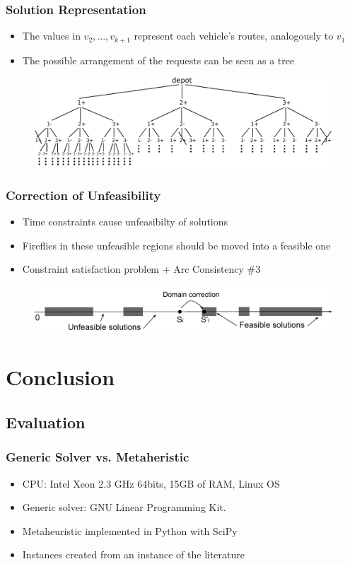\documentclass{beamer}
\begin{document}
\begin{frame}
\frametitle{Solution Representation}
\begin{itemize}
\item The values in $v_2,...,v_{k+1}$ represent each vehicle's routes, analogously to $v_1$
\item The possible arrangement of the requests can be seen as a tree
\end{itemize}
\begin{figure}[b]
\centering
\includegraphics[width=\textwidth]{fig_tree_bus_route}
\end{figure}
\end{frame}

\begin{frame}
\frametitle{Correction of Unfeasibility}
\begin{itemize}
\item Time constraints cause unfeasibilty of solutions
\item Fireflies in these unfeasible regions should be moved into a feasible one
\item Constraint satisfaction problem + Arc Consistency \#3
\end{itemize}
\begin{figure}[b]
\centering
\includegraphics[width=\textwidth]{fig_solution_domain}
\end{figure}
\end{frame}

\section{Conclusion}
\subsection{Evaluation}
\begin{frame}
\frametitle{Generic Solver vs. Metaheristic}
\begin{itemize}
\item CPU: Intel Xeon 2.3 GHz 64bits, 15GB of RAM, Linux OS
\item Generic solver: GNU Linear Programming Kit.
\item Metaheuristic implemented in Python with SciPy
\item Instances created from an instance of the literature
\end{itemize}
\end{frame}
\end{document}
